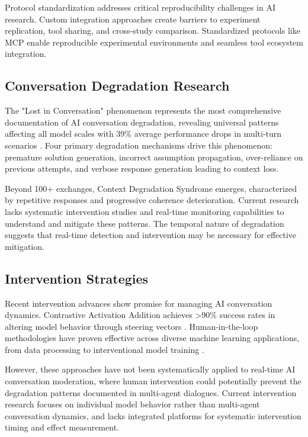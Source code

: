 \documentclass[11pt,letterpaper]{article}
\begin{document}
Protocol standardization addresses critical reproducibility challenges in AI research. Custom integration approaches create barriers to experiment replication, tool sharing, and cross-study comparison. Standardized protocols like MCP enable reproducible experimental environments and seamless tool ecosystem integration.

\subsection{Conversation Degradation Research}

The "Lost in Conversation" phenomenon represents the most comprehensive documentation of AI conversation degradation, revealing universal patterns affecting all model scales with 39\% average performance drops in multi-turn scenarios \citep{laban2025lost}. Four primary degradation mechanisms drive this phenomenon: premature solution generation, incorrect assumption propagation, over-reliance on previous attempts, and verbose response generation leading to context loss.

Beyond 100+ exchanges, Context Degradation Syndrome emerges, characterized by repetitive responses and progressive coherence deterioration. Current research lacks systematic intervention studies and real-time monitoring capabilities to understand and mitigate these patterns. The temporal nature of degradation suggests that real-time detection and intervention may be necessary for effective mitigation.

\subsection{Intervention Strategies}

Recent intervention advances show promise for managing AI conversation dynamics. Contrastive Activation Addition achieves >90\% success rates in altering model behavior through steering vectors \citep{panickssery2024activation}. Human-in-the-loop methodologies have proven effective across diverse machine learning applications, from data processing to interventional model training \citep{wu2022survey}. 

However, these approaches have not been systematically applied to real-time AI conversation moderation, where human intervention could potentially prevent the degradation patterns documented in multi-agent dialogues. Current intervention research focuses on individual model behavior rather than multi-agent conversation dynamics, and lacks integrated platforms for systematic intervention timing and effect measurement.
\end{document}
